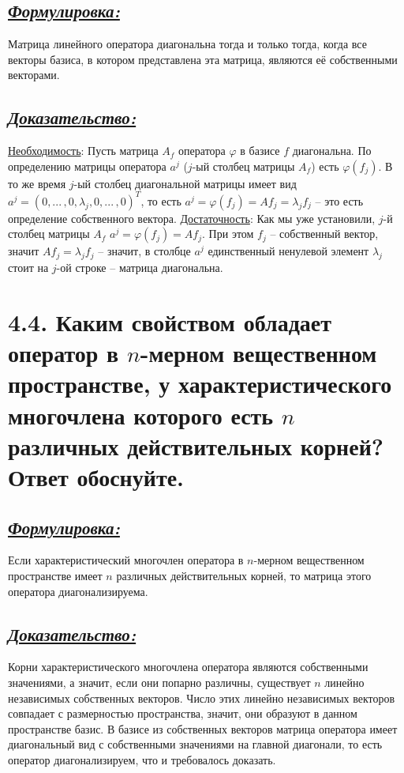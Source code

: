 \documentclass{article}
\begin{document}
\subsection*{\Large \underline{\textit{Формулировка: }}}
Матрица линейного оператора диагональна тогда и только тогда, когда все векторы базиса, в котором представлена эта матрица, являются её собственными векторами. 

\subsection*{\Large \underline{\textit{Доказательство: }}}
\underline{Необходимость}:
\newline Пусть матрица $A_f$ оператора $\varphi$ в базисе $f$ диагональна. По определению матрицы оператора $a^j$ ($j$-ый столбец матрицы $A_f$) есть $\varphi(f_j)$. В то же время $j$-ый столбец диагональной матрицы имеет вид $a^j = (0, ...\,, 0, \lambda_j, 0, ...\,, 0)^T$, то есть $a^j = \varphi(f_j) = \boxed{Af_j = \lambda_jf_j}$ -- это есть определение собственного вектора.
\newline \underline{Достаточность}:
\newline Как мы уже установили, $j$-й столбец матрицы $A_f$ $a^j = \varphi(f_j) = Af_j$. При этом $f_j$ -- собственный вектор, значит $Af_j = \lambda_jf_j$ -- значит, в столбце $a^j$ единственный ненулевой элемент $\lambda_j$ стоит на $j$-ой строке -- матрица диагональна.

\section*{\LARGE 4.4. Каким свойством обладает оператор в $n$-мерном вещественном пространстве, у характеристического многочлена которого есть $n$ различных действительных корней? Ответ обоснуйте.  }
\subsection*{\Large \underline{\textit{Формулировка: }}}
Если характеристический многочлен оператора в $n$-мерном вещественном пространстве имеет $n$ различных действительных корней, то матрица этого оператора диагонализируема.

\subsection*{\Large \underline{\textit{Доказательство: }}}
Корни характеристического многочлена оператора являются собственными значениями, а значит, если они попарно различны, существует $n$ линейно независимых собственных векторов. Число этих линейно независимых векторов совпадает с размерностью пространства, значит, они образуют в данном пространстве базис. В базисе из собственных векторов матрица оператора имеет диагональный вид с собственными значениями на главной диагонали, то есть оператор диагонализируем, что и требовалось доказать.  
\end{document}
